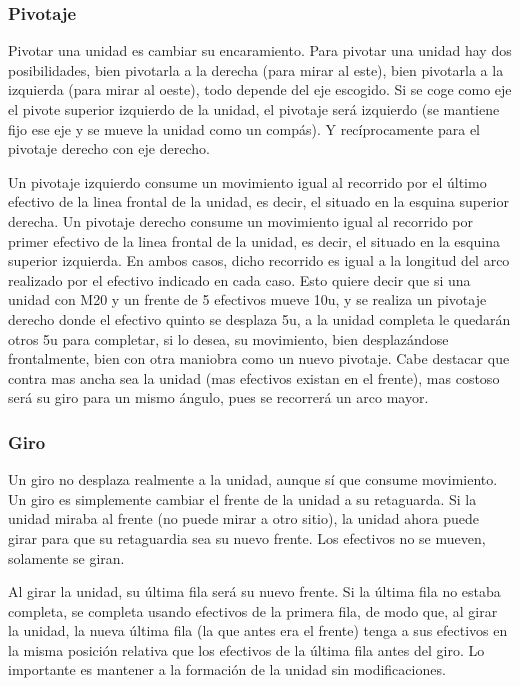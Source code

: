 \subsubsection*{Pivotaje}
\label{pivotaje}
Pivotar una unidad es cambiar su encaramiento. Para pivotar una unidad
hay dos posibilidades, bien pivotarla a la derecha (para mirar al
este), bien pivotarla a la izquierda (para mirar al oeste), todo
depende del eje escogido. Si se coge como eje el pivote superior
izquierdo de la unidad, el pivotaje será izquierdo (se mantiene fijo
ese eje y se mueve la unidad como un compás). Y recíprocamente para el
pivotaje derecho con eje derecho.

Un pivotaje izquierdo consume un movimiento igual al recorrido por el
último efectivo de la linea frontal de la unidad, es decir, el situado
en la esquina superior derecha. Un pivotaje derecho consume un
movimiento igual al recorrido por primer efectivo de la linea frontal
de la unidad, es decir, el situado en la esquina superior
izquierda. En ambos casos, dicho recorrido es igual a la longitud del
arco realizado por el efectivo indicado en cada caso. Esto quiere
decir que si una unidad con M20 y un frente de 5 efectivos mueve 10u,
y se realiza un pivotaje derecho donde el efectivo quinto se desplaza
5u, a la unidad completa le quedarán otros 5u para completar, si lo
desea, su movimiento, bien desplazándose frontalmente, bien con otra
maniobra como un nuevo pivotaje. Cabe destacar que contra mas ancha
sea la unidad (mas efectivos existan en el frente), mas costoso será
su giro para un mismo ángulo, pues se recorrerá un arco mayor.

\subsubsection*{Giro}
\label{giro}
Un giro no desplaza realmente a la unidad, aunque sí que consume
movimiento. Un giro es simplemente cambiar el frente de la unidad a su
retaguarda. Si la unidad miraba al frente (no puede mirar a otro sitio), la unidad
ahora puede girar para que su retaguardia sea su nuevo
frente. Los efectivos no se mueven, solamente se giran.

Al girar la unidad, su última fila será su nuevo frente. Si la última
fila no estaba completa, se completa usando efectivos de la primera
fila, de modo que, al girar la unidad, la nueva última fila (la que
antes era el frente) tenga a sus efectivos en la misma
posición relativa que los efectivos de la última fila antes del
giro. Lo importante es mantener a la formación de la unidad sin modificaciones.

